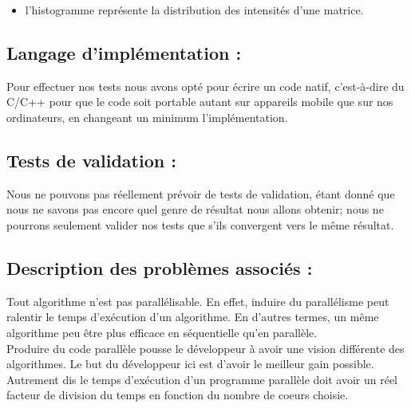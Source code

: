 \begin{itemize}
	\item l’histogramme représente la distribution des intensités d'une matrice.
	
\end{itemize}

	\subsection*{Langage d'implémentation :}
		Pour effectuer nos tests nous avons opté pour écrire un code natif, c'est-à-dire du C/C++ pour que le code soit portable autant sur appareils mobile que sur nos ordinateurs, en changeant un minimum l'implémentation. 

	\subsection*{Tests de validation :}
		Nous ne pouvons pas réellement prévoir de tests de validation, étant donné que nous ne savons pas encore quel genre de résultat nous allons obtenir; nous ne pourrons seulement valider nos tests que s'ils convergent vers le même résultat. 

	\subsection*{Description des problèmes associés :}
		Tout algorithme n'est pas parallélisable. En effet, induire du parallélisme peut ralentir le temps d'exécution d'un algorithme. En d'autres termes, un même algorithme peu être plus efficace en séquentielle qu'en parallèle.\\

		Produire du code parallèle pousse le développeur à avoir une vision différente des algorithmes. Le but du développeur ici est d'avoir le meilleur gain possible. Autrement dis le temps d'exécution d'un programme parallèle doit avoir un réel facteur de division du temps en fonction du nombre de coeurs choisie.
